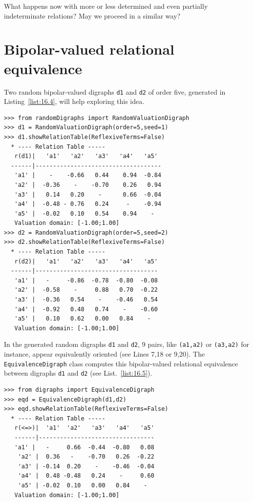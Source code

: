 What happens now with more or less determined and even partially indeterminate relations? May we proceed in a similar way?

\section{Bipolar-valued relational equivalence}
\label{sec:16.3}

Two random bipolar-valued digraphs \texttt{d1} and \texttt{d2} of order five, generated in Listing~\vref{list:16.4}, will help exploring this idea.
\begin{lstlisting}[caption={Two random bipolar-valued digraphs},label=list:16.4]
>>> from randomDigraphs import RandomValuationDigraph
>>> d1 = RandomValuationDigraph(order=5,seed=1)
>>> d1.showRelationTable(ReflexiveTerms=False)
  * ---- Relation Table -----
   r(d1)|   'a1'   'a2'   'a3'   'a4'   'a5'	  
  ------|------------------------------------
   'a1' |    - 	  -0.66	  0.44	  0.94	-0.84	 
   'a2' |  -0.36    - 	 -0.70	  0.26	 0.94	 
   'a3' |   0.14   0.20	   - 	  0.66	-0.04	 
   'a4' |  -0.48 - 0.76	  0.24	   -  	-0.94	 
   'a5' |  -0.02   0.10	  0.54	  0.94    - 	 
   Valuation domain: [-1.00;1.00]
>>> d2 = RandomValuationDigraph(order=5,seed=2)
>>> d2.showRelationTable(ReflexiveTerms=False)
  * ---- Relation Table -----
   r(d2)|   'a1'   'a2'   'a3'   'a4'   'a5'	  
  ------|-----------------------------------
   'a1' |   -     -0.86  -0.78  -0.80  -0.08	 
   'a2' |  -0.58    -     0.88   0.70  -0.22	 
   'a3' |  -0.36   0.54    -    -0.46   0.54	 
   'a4' |  -0.92   0.48   0.74    -    -0.60	 
   'a5' |   0.10   0.62   0.00   0.84    - 	 
   Valuation domain: [-1.00;1.00]
\end{lstlisting}
In the generated random digraphs \texttt{d1} and \texttt{d2}, 9 pairs, like \texttt{(a1,a2)} or \texttt{(a3,a2)} for instance, appear equivalently oriented (see Lines 7,18 or 9,20). The \texttt{Equiva\-lenceDigraph} class computes this bipolar-valued relational equivalence between digraphs \texttt{d1} and \texttt{d2} (see List.~\vref{list:16.5}).
\begin{lstlisting}[caption={Bipolar-valued Equivalence Digraph},label=list:16.5]
>>> from digraphs import EquivalenceDigraph
>>> eqd = EquivalenceDigraph(d1,d2)
>>> eqd.showRelationTable(ReflexiveTerms=False)
  * ---- Relation Table -----
   r(<=>)|  'a1'  'a2'   'a3'   'a4'   'a5'	  
   ------|---------------------------------
   'a1' |   - 	  0.66  -0.44  -0.80   0.08	 
    'a2' |  0.36   -    -0.70   0.26  -0.22	 
    'a3' | -0.14  0.20    -    -0.46  -0.04	 
    'a4' |  0.48 -0.48   0.24    -     0.60	 
    'a5' | -0.02  0.10   0.00   0.84    - 	 
   Valuation domain: [-1.00;1.00]
\end{lstlisting}

